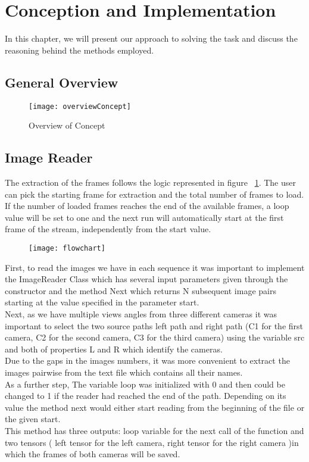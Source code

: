 \section{Conception and Implementation}
\label{Conception and Implementation}

In this chapter, we will present our approach to solving the task and discuss the reasoning behind the methods employed.
\subsection{General Overview}
\begin{figure}[h]
	\texttt{[image: overviewConcept]}
	\caption{Overview of Concept}
\end{figure}


\subsection{Image Reader}

The extraction of the frames follows the logic represented in figure ~\ref{fig:flowchart}. The user can pick the starting frame for extraction and the total number of frames to load. If the number of loaded frames reaches the end of the available frames, a loop value will be set to one and the next run will automatically start at the first frame of the stream, independently from the start value.
\begin{figure}[!h]
	\centering
	\texttt{[image: flowchart]}
	\label{fig:flowchart}
\end{figure}
\newpage
First, to read the images we have in each sequence it was important to implement the ImageReader Class which has several input parameters given through the constructor and the method Next which returns N subsequent image pairs starting at the value specified in the parameter start.
\\
Next, as we have multiple views angles from three different cameras it was important to select the two source paths left path and right path (C1 for the first camera, C2 for the second camera, C3 for the third camera) using the variable src and both of properties L and R which identify the cameras. 
\\
Due to the gaps in the images numbers, it was more convenient to extract the images pairwise from the text file which contains all their names. 
\\
As a further step, The variable loop was initialized with 0 and then could be changed to 1 if the reader had reached the end of the path. Depending on its value the method next would either start reading from the beginning of the file or the given start.
\\
This method has three outputs: loop variable for the next call of the function and two tensors ( left tensor for the left camera, right tensor for the right camera )in which the frames of both cameras will be saved.
